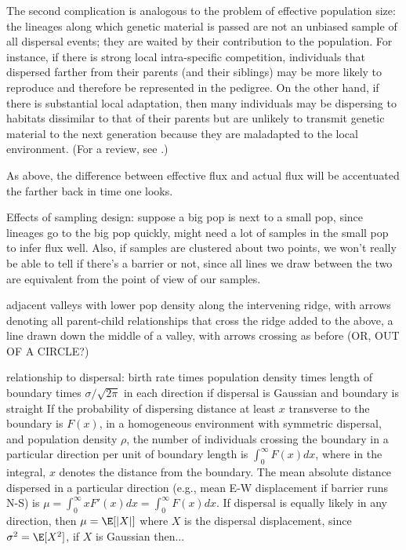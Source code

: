 \documentclass{ar-1col}
\begin{document}
The second complication is analogous to the problem of effective population size:
the lineages along which genetic material is passed are not an unbiased sample of all dispersal events;
they are waited by their contribution to the population.
For instance, if there is strong local intra-specific competition,
individuals that dispersed farther from their parents (and their siblings) 
may be more likely to reproduce and therefore be represented in the pedigree.
On the other hand, if there is substantial local adaptation,
then many individuals may be dispersing to habitats dissimilar to that of their parents
but are unlikely to transmit genetic material to the next generation
because they are maladapted to the local environment.
(For a review, see \citep{bradburdwang}.)

As above, the difference between effective flux and actual flux 
will be accentuated the farther back in time one looks.

Effects of sampling design: suppose a big pop is next to a small pop,
since lineages go to the big pop quickly, might need a lot of samples in the small pop
to infer flux well.
Also, if samples are clustered about two points,
we won't really be able to tell if there's a barrier or not,
since all lines we draw between the two are equivalent
from the point of view of our samples.


 adjacent valleys with lower pop density along the intervening ridge,
with arrows denoting all parent-child relationships that cross the ridge
 added to the above, a line drawn down the middle of a valley, with arrows crossing as before (OR, OUT OF A CIRCLE?)

relationship to dispersal: birth rate times population density times length of boundary times $\sigma/\sqrt{2\pi}$ in each direction
if dispersal is Gaussian and boundary is straight
If the probability of dispersing distance at least $x$ transverse to the boundary is $F(x)$,
in a homogeneous environment with symmetric dispersal,
and population density $\rho$, 
the number of individuals crossing the boundary
in a particular direction
per unit of boundary length
is $\int_0^\infty F(x) dx$, where in the integral, $x$ denotes the distance from the boundary.
The mean absolute distance dispersed in a particular direction
(e.g., mean E-W displacement if barrier runs N-S)
is $\mu = \int_0^\infty x F'(x) dx = \int_0^\infty F(x) dx$.
If dispersal is equally likely in any direction,
then $\mu = \E[|X|]$ where $X$ is the dispersal displacement,
since $\sigma^2 = \E[X^2]$, if $X$ is Gaussian then...
\end{document}
